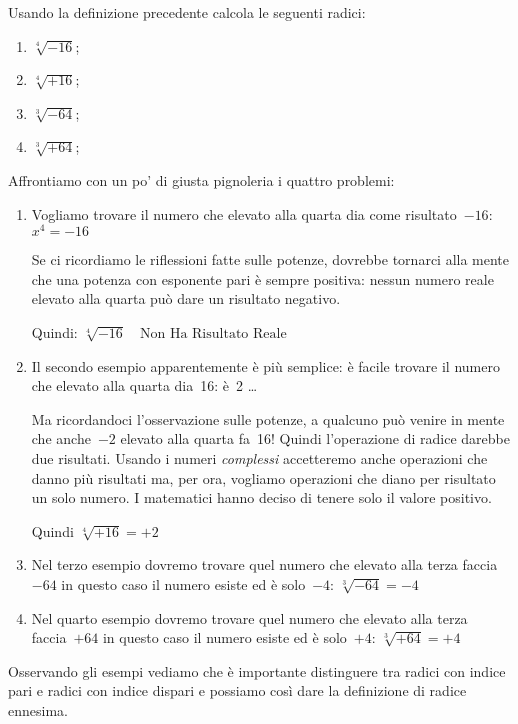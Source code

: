 \begin{esempio}{}{}
Usando la definizione precedente calcola le seguenti radici:
\begin{htmulticols}{4}
\begin{enumerate}
  \item \(\sqrt[4]{-16}\);
  \item \(\sqrt[4]{+16}\);
  \item \(\sqrt[3]{-64}\);
  \item \(\sqrt[3]{+64}\);
\end{enumerate}
\end{htmulticols}
Affrontiamo con un po' di giusta pignoleria i quattro problemi:
\begin{enumerate}
\item Vogliamo trovare il numero che elevato alla 
quarta dia come risultato~\(-16\): \(x^4=-16\)

Se ci ricordiamo le riflessioni fatte sulle potenze, dovrebbe tornarci alla 
mente che una potenza con esponente pari è sempre positiva: nessun numero 
reale elevato alla quarta può dare un risultato negativo.

Quindi: \(\sqrt[4]{-16} \quad \text{Non Ha Risultato Reale}\)  

\item Il secondo esempio apparentemente è più semplice: è facile trovare 
il numero che elevato alla quarta dia~16: è~2 \dots

Ma ricordandoci l'osservazione sulle potenze, a qualcuno può venire in 
mente che anche~\(-2\) elevato alla quarta fa~16! 
Quindi l'operazione di radice darebbe due risultati. 
Usando i numeri \emph{complessi} accetteremo anche operazioni che danno 
più risultati ma, per ora, vogliamo operazioni che diano per risultato 
un solo numero. 
I matematici hanno deciso di tenere solo il valore positivo.

Quindi \(\sqrt[4]{+16} = +2\)
\item Nel terzo esempio dovremo trovare quel numero che elevato alla terza 
faccia~\(-64\) in questo caso il numero esiste ed è solo~\(-4\):
\(\sqrt[3]{-64} = -4\)
\item Nel quarto esempio dovremo trovare quel numero che elevato alla 
terza faccia~\(+64\) in questo caso il numero esiste ed è solo~\(+4\):
\(\sqrt[3]{+64} = +4\)
\end{enumerate}
\end{esempio}

Osservando gli esempi vediamo che è importante distinguere tra radici con 
indice pari e radici con indice dispari e possiamo così dare la 
definizione di radice ennesima.

